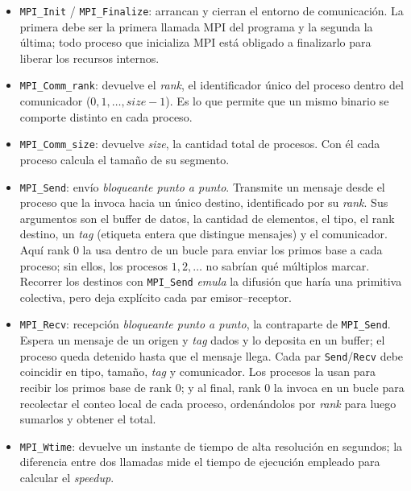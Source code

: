\documentclass[conference]{IEEEtran}
\begin{document}
\begin{itemize}
  \item \texttt{MPI\_Init} / \texttt{MPI\_Finalize}: arrancan y cierran el
        entorno de comunicación. La primera debe ser la primera llamada MPI del
        programa y la segunda la última; todo proceso que inicializa MPI está
        obligado a finalizarlo para liberar los recursos internos.
  \item \texttt{MPI\_Comm\_rank}: devuelve el \textit{rank}, el identificador
        único del proceso dentro del comunicador ($0, 1, \dots, size-1$). Es lo
        que permite que un mismo binario se comporte distinto en cada proceso.
  \item \texttt{MPI\_Comm\_size}: devuelve \textit{size}, la cantidad total de
        procesos. Con él cada proceso calcula el tamaño de su segmento.
  \item \texttt{MPI\_Send}: envío \textit{bloqueante punto a punto}. Transmite un
        mensaje desde el proceso que la invoca hacia un único destino,
        identificado por su \textit{rank}. Sus argumentos son el buffer de datos,
        la cantidad de elementos, el tipo, el rank destino, un \textit{tag}
        (etiqueta entera que distingue mensajes) y el comunicador. Aquí rank 0 la
        usa dentro de un bucle para enviar los primos base a cada proceso; sin
        ellos, los procesos $1,2,\dots$ no sabrían qué múltiplos marcar. Recorrer
        los destinos con \texttt{MPI\_Send} \emph{emula} la difusión que haría una
        primitiva colectiva, pero deja explícito cada par emisor--receptor.
  \item \texttt{MPI\_Recv}: recepción \textit{bloqueante punto a punto}, la
        contraparte de \texttt{MPI\_Send}. Espera un mensaje de un origen y
        \textit{tag} dados y lo deposita en un buffer; el proceso queda detenido
        hasta que el mensaje llega. Cada par \texttt{Send}/\texttt{Recv} debe
        coincidir en tipo, tamaño, \textit{tag} y comunicador. Los procesos la
        usan para recibir los primos base de rank 0; y al final, rank 0 la invoca
        en un bucle para recolectar el conteo local de cada proceso, ordenándolos
        por \textit{rank} para luego sumarlos y obtener el total.
  \item \texttt{MPI\_Wtime}: devuelve un instante de tiempo de alta resolución
        en segundos; la diferencia entre dos llamadas mide el tiempo de
        ejecución empleado para calcular el \textit{speedup}.
\end{itemize}
\end{document}
